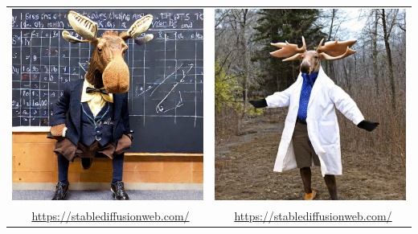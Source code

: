 \documentclass[compress, aspectratio=169]{beamer}
\begin{document}
\begin{frame}
\begin{columns}
\begin{column}{0.6\textwidth}
\begin{tabular}{cc}
	\includegraphics[scale=0.15]{moose_mathematician.jpeg} & \includegraphics[scale=0.15]{moose_scientist.jpeg} \\
	\tiny \ccPublicDomain\ \href{https://stablediffusionweb.com/}{https://stablediffusionweb.com/} & \tiny \ccPublicDomain\ \href{https://stablediffusionweb.com/}{https://stablediffusionweb.com/} \\

\end{tabular}
\end{column}
\end{columns}
\end{frame}
\end{document}
